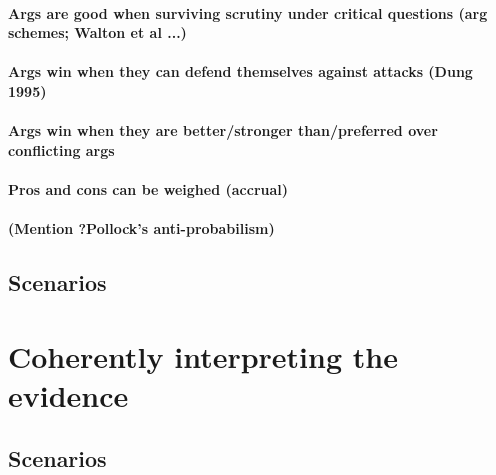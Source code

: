\documentclass[10pt]{article}
\begin{document}
\paragraph{Args are good when surviving scrutiny under critical questions (arg schemes; Walton et al ...)}

\paragraph{Args win when they can defend themselves against attacks (Dung 1995)}

\paragraph{Args win when they are better/stronger than/preferred over conflicting args}

\paragraph{Pros and cons can be weighed (accrual)}

\paragraph{(Mention ?Pollock's anti-probabilism)}

\subsection{Scenarios}


\section{Coherently interpreting the evidence}

\subsection{Scenarios}
\end{document}

